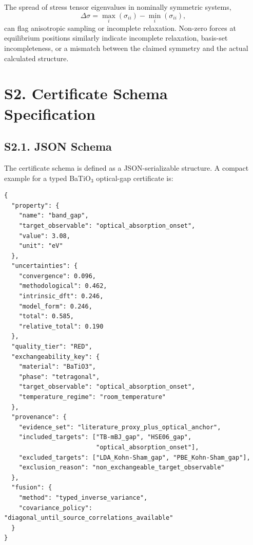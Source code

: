﻿\documentclass[prb,onecolumn,superscriptaddress,amsmath,amssymb,longbibliography]{revtex4-2}
\begin{document}
The spread of stress tensor eigenvalues in nominally symmetric systems,
\begin{equation}
    \Delta\sigma = \max_i(\sigma_{ii}) - \min_i(\sigma_{ii}),
    \label{eq:si_stress_spread}
\end{equation}
can flag anisotropic sampling or incomplete relaxation. Non-zero forces at
equilibrium positions similarly indicate incomplete relaxation, basis-set
incompleteness, or a mismatch between the claimed symmetry and the actual
calculated structure.


\section{S2. Certificate Schema Specification}
\label{sec:si_schema}

\subsection{S2.1. JSON Schema}

The certificate schema is defined as a JSON-serializable structure. A compact
example for a typed BaTiO$_3$ optical-gap certificate is:

\begin{verbatim}
{
  "property": {
    "name": "band_gap",
    "target_observable": "optical_absorption_onset",
    "value": 3.08,
    "unit": "eV"
  },
  "uncertainties": {
    "convergence": 0.096,
    "methodological": 0.462,
    "intrinsic_dft": 0.246,
    "model_form": 0.246,
    "total": 0.585,
    "relative_total": 0.190
  },
  "quality_tier": "RED",
  "exchangeability_key": {
    "material": "BaTiO3",
    "phase": "tetragonal",
    "target_observable": "optical_absorption_onset",
    "temperature_regime": "room_temperature"
  },
  "provenance": {
    "evidence_set": "literature_proxy_plus_optical_anchor",
    "included_targets": ["TB-mBJ_gap", "HSE06_gap",
                         "optical_absorption_onset"],
    "excluded_targets": ["LDA_Kohn-Sham_gap", "PBE_Kohn-Sham_gap"],
    "exclusion_reason": "non_exchangeable_target_observable"
  },
  "fusion": {
    "method": "typed_inverse_variance",
    "covariance_policy": "diagonal_until_source_correlations_available"
  }
}
\end{verbatim}
\end{document}
